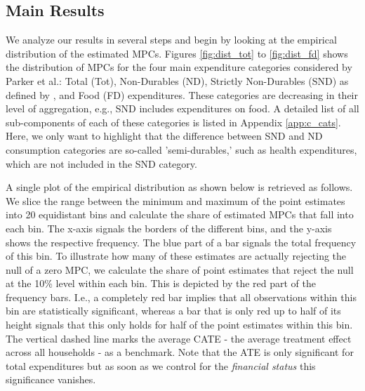\subsection{Main Results} \label{subsec:main_res}
We analyze our results in several steps and begin by looking at the empirical distribution of the estimated MPCs. Figures \ref{fig:dist_tot} to \ref{fig:dist_fd} shows the distribution of MPCs for the four main expenditure categories considered by Parker et al.: Total (Tot), Non-Durables (ND), Strictly Non-Durables (SND) as defined by \cite{lusardi_1996}, and Food (FD) expenditures. These categories are decreasing in their level of aggregation, e.g., SND includes expenditures on food. A detailed list of all sub-components of each of these categories is listed in Appendix \ref{app:c_cats}. Here, we only want to highlight that the difference between SND and ND consumption categories are so-called 'semi-durables,' such as health expenditures, which are not included in the SND category. 

\noindent A single plot of the empirical distribution as shown below is retrieved as follows. We slice the range between the minimum and maximum of the point estimates into 20 equidistant bins and calculate the share of estimated MPCs that fall into each bin. The x-axis signals the borders of the different bins, and the y-axis shows the respective frequency. The blue part of a bar signals the total frequency of this bin. To illustrate how many of these estimates are actually rejecting the null of a zero MPC, we calculate the share of point estimates that reject the null at the 10\% level within each bin. This is depicted by the red part of the frequency bars. I.e., a completely red bar implies that all observations within this bin are statistically significant, whereas a bar that is only red up to half of its height signals that this only holds for half of the point estimates within this bin. The vertical dashed line marks the average CATE - the average treatment effect across all households - as a benchmark. Note that the ATE is only significant for total expenditures but as soon as we control for the \textit{financial status} this significance vanishes.
